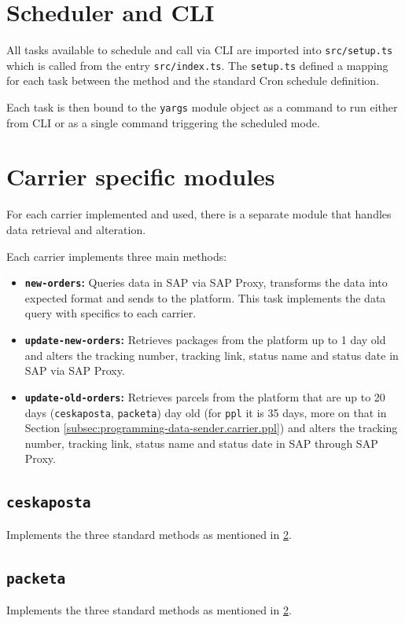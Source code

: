 \section{Scheduler and \ac{CLI}}
All tasks available to schedule and call via \ac{CLI} are imported into \texttt{src/setup.ts} which is called from the entry \texttt{src/index.ts}.
The \texttt{setup.ts} defined a mapping for each task between the method and the standard Cron schedule definition.

Each task is then bound to the \texttt{yargs} module object as a command to run either from \ac{CLI} or as a single command triggering the scheduled mode.

\section{Carrier specific modules}
\label{subsec:programming-data-sender.carrier}

For each carrier implemented and used, there is a separate module that handles data retrieval and alteration.

Each carrier implements three main methods: 
\begin{itemize}
    \item \textbf{\texttt{new-orders}:} Queries data in SAP via SAP Proxy, transforms the data into expected format and sends to the platform. This task implements the data query with specifics to each carrier. 
    \item \textbf{\texttt{update-new-orders}:} Retrieves packages from the platform up to 1 day old and alters the tracking number, tracking link, status name and status date in SAP via SAP Proxy.
    \item \textbf{\texttt{update-old-orders}:} Retrieves parcels from the platform that are up to 20 days (\texttt{ceskaposta}, \texttt{packeta}) day old (for \texttt{ppl} it is 35 days, more on that in Section \ref{subsec:programming-data-sender.carrier.ppl}) and alters the tracking number, tracking link, status name and status date in SAP through SAP Proxy.
\end{itemize}
\subsection{\texttt{ceskaposta}}
Implements the three standard methods as mentioned in \ref{subsec:programming-data-sender.carrier}.
\subsection{\texttt{packeta}}
Implements the three standard methods as mentioned in \ref{subsec:programming-data-sender.carrier}.
